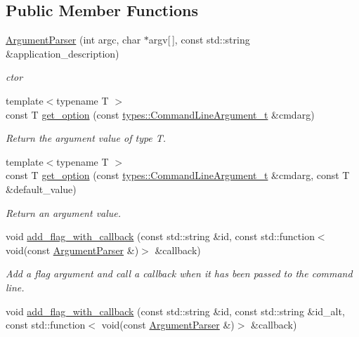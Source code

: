 \subsection*{Public Member Functions}
\begin{DoxyCompactItemize}
\item 
\hyperlink{classcppargparse_1_1parser_1_1ArgumentParser_a704fa488168e08c7ae727445c5fa710a}{Argument\+Parser} (int argc, char $\ast$argv\mbox{[}$\,$\mbox{]}, const std\+::string \&application\+\_\+description)
\begin{DoxyCompactList}\small\item\em c\textquotesingle{}tor \end{DoxyCompactList}\item 
{\footnotesize template$<$typename T $>$ }\\const T \hyperlink{classcppargparse_1_1parser_1_1ArgumentParser_a244bd1a82c40dee15f89651ac2e63be3}{get\+\_\+option} (const \hyperlink{structcppargparse_1_1types_1_1CommandLineArgument__t}{types\+::\+Command\+Line\+Argument\+\_\+t} \&cmdarg)
\begin{DoxyCompactList}\small\item\em Return the argument value of type T. \end{DoxyCompactList}\item 
{\footnotesize template$<$typename T $>$ }\\const T \hyperlink{classcppargparse_1_1parser_1_1ArgumentParser_ae74d77501679cce38a72e6fa1534e64a}{get\+\_\+option} (const \hyperlink{structcppargparse_1_1types_1_1CommandLineArgument__t}{types\+::\+Command\+Line\+Argument\+\_\+t} \&cmdarg, const T \&default\+\_\+value)
\begin{DoxyCompactList}\small\item\em Return an argument value. \end{DoxyCompactList}\item 
void \hyperlink{classcppargparse_1_1parser_1_1ArgumentParser_aa9abf9b86b7310784d04085cff2a4d3c}{add\+\_\+flag\+\_\+with\+\_\+callback} (const std\+::string \&id, const std\+::function$<$ void(const \hyperlink{classcppargparse_1_1parser_1_1ArgumentParser}{Argument\+Parser} \&)$>$ \&callback)
\begin{DoxyCompactList}\small\item\em Add a flag argument and call a callback when it has been passed to the command line. \end{DoxyCompactList}\item 
void \hyperlink{classcppargparse_1_1parser_1_1ArgumentParser_ac117877909d58e4a18d6a5094c2c6877}{add\+\_\+flag\+\_\+with\+\_\+callback} (const std\+::string \&id, const std\+::string \&id\+\_\+alt, const std\+::function$<$ void(const \hyperlink{classcppargparse_1_1parser_1_1ArgumentParser}{Argument\+Parser} \&)$>$ \&callback)

\end{DoxyCompactItemize}
